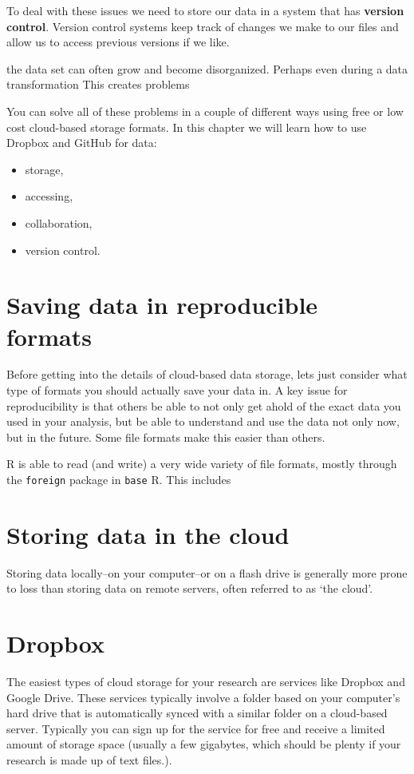\documentclass[ChapterTOCs,krantz1]{krantz}\usepackage{graphicx, color}
\begin{document}
To deal with these issues we need to store our data in a system that has
\textbf{version control}. Version control systems keep track of changes
we make to our files and allow us to access previous versions if we
like.

the data set can often grow and become disorganized. Perhaps even during
a data transformation This creates problems

You can solve all of these problems in a couple of different ways using
free or low cost cloud-based storage formats. In this chapter we will
learn how to use Dropbox and GitHub for data:

\begin{itemize}
\item
  storage,
\item
  accessing,
\item
  collaboration,
\item
  version control.
\end{itemize}
\section{Saving data in reproducible formats}

Before getting into the details of cloud-based data storage, lets just
consider what type of formats you should actually save your data in. A
key issue for reproducibility is that others be able to not only get
ahold of the exact data you used in your analysis, but be able to
understand and use the data not only now, but in the future. Some file
formats make this easier than others.

R is able to read (and write) a very wide variety of file
formats, mostly through the \texttt{foreign} package in \texttt{base}
R. This includes

\section{Storing data in the cloud}

Storing data locally--on your computer--or on a flash drive is generally
more prone to loss than storing data on remote servers, often referred
to as `the cloud'.

\section{Dropbox}

The easiest types of cloud storage for your research are services like
Dropbox and Google Drive. These services typically
involve a folder based on your computer's hard drive that is
automatically synced with a similar folder on a cloud-based server.
Typically you can sign up for the service for free and receive a limited
amount of storage space (usually a few gigabytes, which should be plenty
if your research is made up of text files.).
\end{document}
